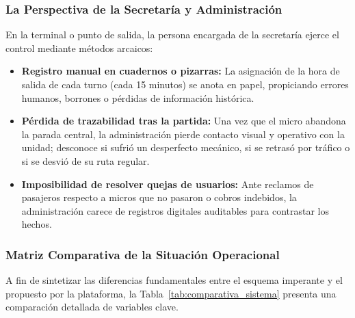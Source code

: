 \subsubsection{La Perspectiva de la Secretaría y Administración}

En la terminal o punto de salida, la persona encargada de la secretaría ejerce el control mediante métodos arcaicos:

\begin{itemize}
    \item \textbf{Registro manual en cuadernos o pizarras:} La asignación de la hora de salida de cada turno (cada 15 minutos) se anota en papel, propiciando errores humanos, borrones o pérdidas de información histórica.
    \item \textbf{Pérdida de trazabilidad tras la partida:} Una vez que el micro abandona la parada central, la administración pierde contacto visual y operativo con la unidad; desconoce si sufrió un desperfecto mecánico, si se retrasó por tráfico o si se desvió de su ruta regular.
    \item \textbf{Imposibilidad de resolver quejas de usuarios:} Ante reclamos de pasajeros respecto a micros que no pasaron o cobros indebidos, la administración carece de registros digitales auditables para contrastar los hechos.
\end{itemize}

\subsubsection{Matriz Comparativa de la Situación Operacional}

A fin de sintetizar las diferencias fundamentales entre el esquema imperante y el propuesto por la plataforma, la Tabla~\ref{tab:comparativa_sistema} presenta una comparación detallada de variables clave.

